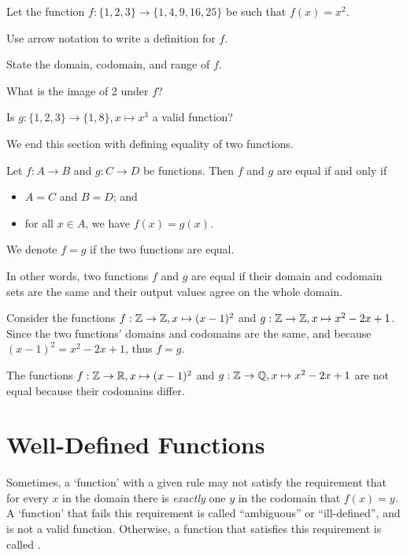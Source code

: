 \begin{exercise}
    Let the function $f: \{1, 2, 3\} \to \{1, 4, 9, 16, 25\}$ be such that $f(x) = x^2$.
    \begin{partquestions}{\roman*}
        \item Use arrow notation to write a definition for $f$.
        \item State the domain, codomain, and range of $f$.
        \item What is the image of 2 under $f$?
        \item Is $g: \{1, 2, 3\} \to \{1, 8\}, x \mapsto x^3$ a valid function?
    \end{partquestions}
\end{exercise}

\newpage

We end this section with defining equality of two functions.
\begin{definition}
    Let $f: A \to B$ and $g: C \to D$ be functions. Then $f$ and $g$ are equal if and only if
    \begin{itemize}
        \item $A = C$ and $B = D$; and
        \item for all $x \in A$, we have $f(x) = g(x)$.
    \end{itemize}
    We denote $f = g$ if the two functions are equal.
\end{definition}

In other words, two functions $f$ and $g$ are equal if their domain and codomain sets are the same and their output values agree on the whole domain.

\begin{example}
    Consider the functions $f: \mathbb{Z} \to \mathbb{Z}, x \mapsto (x-1)^2$ and $g: \mathbb{Z} \to \mathbb{Z}, x \mapsto x^2 - 2x + 1$. Since the two functions' domains and codomains are the same, and because $(x-1)^2 = x^2 - 2x + 1$, thus $f = g$.
\end{example}

\begin{example}
    The functions $f: \mathbb{Z} \to \mathbb{R}, x \mapsto (x-1)^2$ and $g: \mathbb{Z} \to \mathbb{Q}, x \mapsto x^2 - 2x + 1$ are not equal because their codomains differ.
\end{example}

\section{Well-Defined Functions}
Sometimes, a `function' with a given rule may not satisfy the requirement that for every $x$ in the domain there is \textit{exactly} one $y$ in the codomain that $f(x) = y$. A `function' that fails this requirement is called ``ambiguous'' or ``ill-defined'', and is not a valid function. Otherwise, a function that satisfies this requirement is called .

